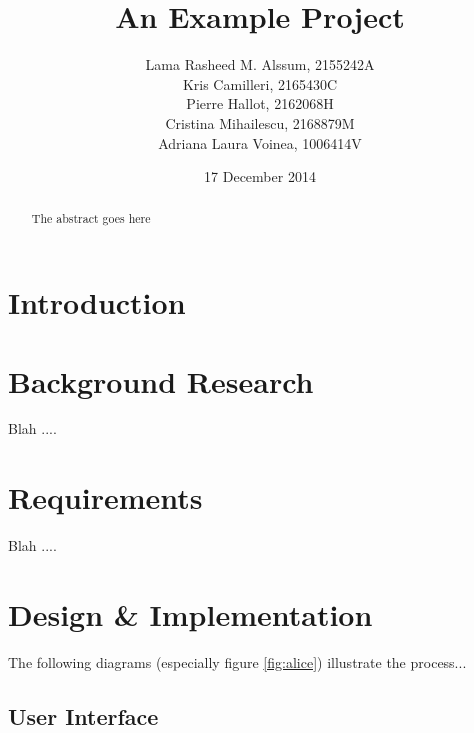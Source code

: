 \documentclass{lmproj}
\begin{document}
\title{An Example Project}
\author{Lama Rasheed M. Alssum, 2155242A \\
        Kris Camilleri, 2165430C \\
        Pierre Hallot, 2162068H  \\
        Cristina Mihailescu, 2168879M \\
        Adriana Laura Voinea, 1006414V}


\date{17 December 2014}
\maketitle
\begin{abstract}

The abstract goes here

\end{abstract}
\educationalconsent
\tableofcontents
\chapter{Introduction}
\label{intro}


\chapter{Background Research}
\label{background}

Blah ....


\chapter{Requirements}
\label{requirement}

Blah ....



\chapter{Design \& Implementation}
\label{design}

The following diagrams (especially figure \ref{fig:alice}) illustrate the
process...


\section{User Interface}
\end{document}
